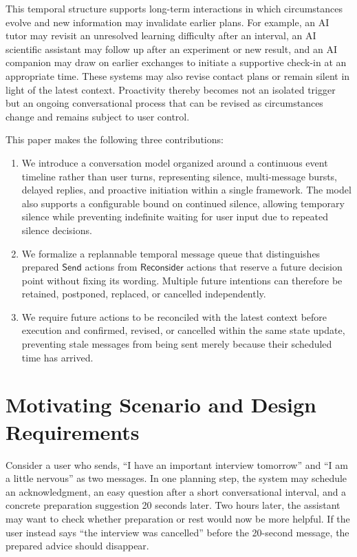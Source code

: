 \documentclass[manuscript,nonacm]{acmart}
\begin{document}
This temporal structure supports long-term interactions in which circumstances
evolve and new information may invalidate earlier plans. For example, an AI tutor
may revisit an unresolved learning difficulty after an interval, an AI scientific
assistant may follow up after an experiment or new result, and an AI companion
may draw on earlier exchanges to initiate a supportive check-in at an appropriate
time. These systems may also revise contact plans or remain silent in light of
the latest context.
Proactivity thereby becomes not an isolated trigger but an ongoing conversational
process that can be revised as circumstances change and remains subject to user
control.

This paper makes the following three contributions:

\begin{enumerate}
  \item We introduce a conversation model organized around a continuous event
  timeline rather than user turns, representing silence, multi-message bursts,
  delayed replies, and proactive initiation within a single framework. The model
  also supports a configurable bound on continued silence, allowing temporary
  silence while preventing indefinite waiting for user input due to repeated
  silence decisions.
  \item We formalize a replannable temporal message queue that distinguishes
  prepared $\mathsf{Send}$ actions from $\mathsf{Reconsider}$ actions that reserve
  a future decision point without fixing its wording. Multiple future intentions
  can therefore be retained, postponed, replaced, or cancelled independently.
  \item We require future actions to be reconciled with the latest context before
  execution and confirmed, revised, or cancelled within the same state update,
  preventing stale messages from being sent merely because their scheduled time
  has arrived.
\end{enumerate}

\section{Motivating Scenario and Design Requirements}

Consider a user who sends, ``I have an important interview tomorrow'' and ``I am
a little nervous'' as two messages. In one planning step, the system may schedule
an acknowledgment, an easy question after a short conversational interval, and
a concrete preparation suggestion 20 seconds later. Two hours later, the assistant may want
to check whether preparation or rest would now be more helpful. If the user
instead says ``the interview was cancelled'' before the 20-second message, the
prepared advice should disappear.
\end{document}
